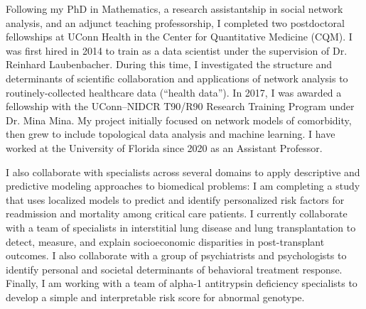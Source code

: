 \documentclass{nihbiosketch}
\begin{document}
\begin{statement}

Following my PhD in Mathematics, a research assistantship in social network analysis, and an adjunct teaching professorship, I completed two postdoctoral fellowships at UConn Health in the Center for Quantitative Medicine (CQM).
I was first hired in 2014 to train as a data scientist under the supervision of Dr. Reinhard Laubenbacher.
During this time, I investigated the structure and determinants of scientific collaboration and applications of network analysis to routinely-collected healthcare data (``health data'').
In 2017, I was awarded a fellowship with the UConn--NIDCR T90/R90 Research Training Program under Dr. Mina Mina. My project initially focused on network models of comorbidity, then grew to include topological data analysis and machine learning.
I have worked at the University of Florida since 2020 as an Assistant Professor.



I also collaborate with specialists across several domains to apply descriptive and predictive modeling approaches to biomedical problems:
I am completing a study that uses localized models to predict and identify personalized risk factors for readmission and mortality among critical care patients.
I currently collaborate with a team of specialists in interstitial lung disease and lung transplantation to detect, measure, and explain socioeconomic disparities in post-transplant outcomes.
I also collaborate with a group of psychiatrists and psychologists to identify personal and societal determinants of behavioral treatment response.
Finally, I am working with a team of alpha-1 antitrypsin deficiency specialists to develop a simple and interpretable risk score for abnormal genotype.



\end{statement}
\end{document}
